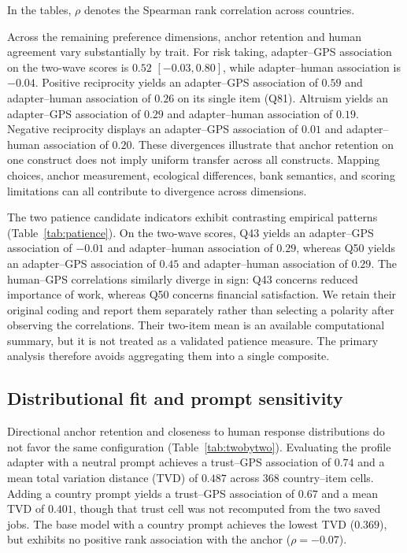 In the tables, $\rho$ denotes the Spearman rank correlation across countries.


Across the remaining preference dimensions, anchor retention and human agreement vary substantially by trait. For risk taking, adapter--GPS association on the two-wave scores is $0.52$ $[-0.03, 0.80]$, while adapter--human association is $-0.04$. Positive reciprocity yields an adapter--GPS association of $0.59$ and adapter--human association of $0.26$ on its single item (Q81). Altruism yields an adapter--GPS association of $0.29$ and adapter--human association of $0.19$. Negative reciprocity displays an adapter--GPS association of $0.01$ and adapter--human association of $0.20$. These divergences illustrate that anchor retention on one construct does not imply uniform transfer across all constructs. Mapping choices, anchor measurement, ecological differences, bank semantics, and scoring limitations can all contribute to divergence across dimensions.


The two patience candidate indicators exhibit contrasting empirical patterns (Table~\ref{tab:patience}). On the two-wave scores, Q43 yields an adapter--GPS association of $-0.01$ and adapter--human association of $0.29$, whereas Q50 yields an adapter--GPS association of $0.45$ and adapter--human association of $0.29$. The human--GPS correlations similarly diverge in sign: Q43 concerns reduced importance of work, whereas Q50 concerns financial satisfaction. We retain their original coding and report them separately rather than selecting a polarity after observing the correlations. Their two-item mean is an available computational summary, but it is not treated as a validated patience measure. The primary analysis therefore avoids aggregating them into a single composite.

\subsection{Distributional fit and prompt sensitivity}
Directional anchor retention and closeness to human response distributions do not favor the same configuration (Table~\ref{tab:twobytwo}). Evaluating the profile adapter with a neutral prompt achieves a trust--GPS association of $0.74$ and a mean total variation distance (TVD) of $0.487$ across 368 country--item cells. Adding a country prompt yields a trust--GPS association of $0.67$ and a mean TVD of $0.401$, though that trust cell was not recomputed from the two saved jobs. The base model with a country prompt achieves the lowest TVD ($0.369$), but exhibits no positive rank association with the anchor ($\rho = -0.07$).

